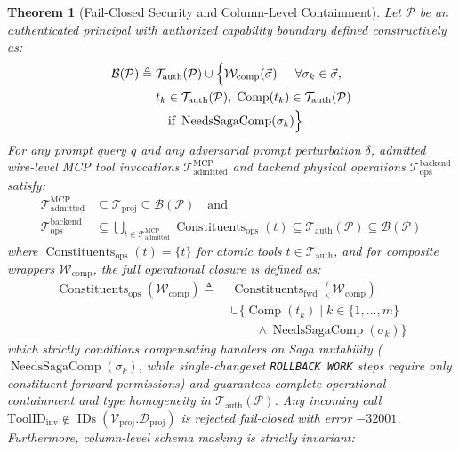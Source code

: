 \documentclass[conference,10pt]{IEEEtran}
\newtheorem{theorem}{Theorem}
\begin{document}
\begin{theorem}[Fail-Closed Security and Column-Level Containment]
Let $\mathcal{P}$ be an authenticated principal with authorized capability boundary defined constructively as:
\begin{equation}
\begin{aligned}
\mathcal{B}(\mathcal{P}) \triangleq \;&\mathcal{T}_{\text{auth}}(\mathcal{P}) \cup \Bigl\{ \mathcal{W}_{\text{comp}}(\vec{\sigma}) \;\Bigm|\; \forall \sigma_k \in \vec{\sigma}, \\
&t_k \in \mathcal{T}_{\text{auth}}(\mathcal{P}), \; \operatorname{Comp}(t_k) \in \mathcal{T}_{\text{auth}}(\mathcal{P}) \\
&\quad \text{if } \operatorname{NeedsSagaComp}(\sigma_k) \Bigr\}
\end{aligned}
\end{equation}
For any prompt query $q$ and any adversarial prompt perturbation $\delta$, admitted wire-level MCP tool invocations $\mathcal{T}_{\text{admitted}}^{\text{MCP}}$ and backend physical operations $\mathcal{T}_{\text{ops}}^{\text{backend}}$ satisfy:
\begin{equation}
\begin{aligned}
\mathcal{T}_{\text{admitted}}^{\text{MCP}} &\subseteq \mathcal{T}_{\text{proj}} \subseteq \mathcal{B}(\mathcal{P}) \quad \text{and} \\
\mathcal{T}_{\text{ops}}^{\text{backend}} &\subseteq \bigcup\nolimits_{t \in \mathcal{T}_{\text{admitted}}^{\text{MCP}}} \operatorname{Constituents}_{\text{ops}}(t) \subseteq \mathcal{T}_{\text{auth}}(\mathcal{P}) \subseteq \mathcal{B}(\mathcal{P})
\end{aligned}
\end{equation}
where $\operatorname{Constituents}_{\text{ops}}(t) = \{t\}$ for atomic tools $t \in \mathcal{T}_{\text{auth}}$, and for composite wrappers $\mathcal{W}_{\text{comp}}$, the full operational closure is defined as:
\begin{equation}
\begin{aligned}
\operatorname{Constituents}_{\text{ops}}(\mathcal{W}_{\text{comp}}) \triangleq \;&\operatorname{Constituents}_{\text{fwd}}(\mathcal{W}_{\text{comp}}) \\
&\cup \big\{\operatorname{Comp}(t_k) \mid k \in \{1, \dots, m\} \\
&\qquad \land \operatorname{NeedsSagaComp}(\sigma_k)\big\}
\end{aligned}
\end{equation}
which strictly conditions compensating handlers on Saga mutability ($\operatorname{NeedsSagaComp}(\sigma_k)$, while single-changeset \texttt{ROLLBACK WORK} steps require only constituent forward permissions) and guarantees complete operational containment and type homogeneity in $\mathcal{T}_{\text{auth}}(\mathcal{P})$. Any incoming call $\text{ToolID}_{\text{inv}} \notin \operatorname{IDs}(\mathcal{V}_{\text{proj}}.\mathcal{D}_{\text{proj}})$ is rejected fail-closed with error $-32001$. Furthermore, column-level schema masking is strictly invariant:

\end{theorem}
\end{document}
